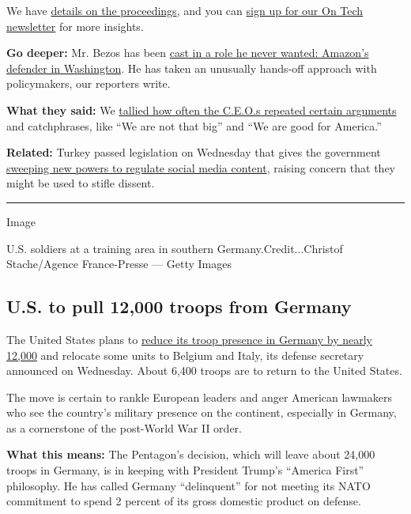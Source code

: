We have
\href{https://www.nytimes.com/live/2020/07/29/technology/tech-ceos-hearing-testimony}{details
on the proceedings}, and you can
\href{https://www.nytimes.com/newsletters/signup/OT}{sign up for our On
Tech newsletter} for more insights.

\textbf{Go deeper:} Mr. Bezos has been
\href{https://www.nytimes.com/2020/07/27/business/jeff-bezos-amazon-congress.html}{cast
in a role he never wanted: Amazon's defender in Washington}. He has
taken an unusually hands-off approach with policymakers, our reporters
write.

\textbf{What they said:} We
\href{https://www.nytimes.com/live/2020/07/29/technology/tech-ceos-hearing-testimony/what-ceos-said}{tallied
how often the C.E.O.s repeated certain arguments} and catchphrases, like
``We are not that big'' and ``We are good for America.''

\textbf{Related:} Turkey passed legislation on Wednesday that gives the
government
\href{https://www.nytimes.com/2020/07/29/world/europe/turkey-social-media-control.html}{sweeping
new powers to regulate social media content}, raising concern that they
might be used to stifle dissent.

\begin{center}\rule{0.5\linewidth}{\linethickness}\end{center}

Image

U.S. soldiers at a training area in southern Germany.Credit...Christof
Stache/Agence France-Presse --- Getty Images

\hypertarget{us-to-pull-12000-troops-from-germany}{%
\subsection{U.S. to pull 12,000 troops from
Germany}\label{us-to-pull-12000-troops-from-germany}}

The United States plans to
\href{https://www.nytimes.com/2020/07/29/world/europe/us-troops-nato-germany.html}{reduce
its troop presence in Germany by nearly 12,000} and relocate some units
to Belgium and Italy, its defense secretary announced on Wednesday.
About 6,400 troops are to return to the United States.

The move is certain to rankle European leaders and anger American
lawmakers who see the country's military presence on the continent,
especially in Germany, as a cornerstone of the post-World War II order.

\textbf{What this means:} The Pentagon's decision, which will leave
about 24,000 troops in Germany, is in keeping with President Trump's
``America First'' philosophy. He has called Germany ``delinquent'' for
not meeting its NATO commitment to spend 2 percent of its gross domestic
product on defense.

